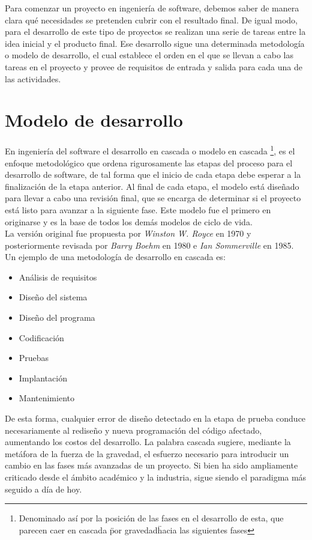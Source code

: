 Para comenzar un proyecto en ingenier\'ia de software, debemos saber de manera clara qu\'e necesidades se pretenden cubrir con el resultado final. De igual modo, para el desarrollo de este tipo de proyectos se realizan una serie de tareas entre la idea inicial y el producto final. Ese desarrollo sigue una determinada metodolog\'ia o modelo de desarrollo, el cual establece el orden en el que se llevan a cabo las tareas en el proyecto y provee de requisitos de entrada y salida para cada una de las actividades.\\

\section{Modelo de desarrollo}
En ingenier\'ia del software el desarrollo en cascada o modelo en cascada  \footnote[1] {Denominado as\'i por la posici\'on de las fases en el desarrollo de esta, que parecen caer en cascada \"por gravedad\" hacia las siguientes fases}, es el enfoque metodol\'ogico que ordena rigurosamente las etapas del proceso para el desarrollo de software, de tal forma que el inicio de cada etapa debe esperar a la finalizaci\'on de la etapa anterior. Al final de cada etapa, el modelo est\'a dise\~nado para llevar a cabo una revisi\'on final, que se encarga de determinar si el proyecto est\'a listo para avanzar a la siguiente fase. Este modelo fue el primero en originarse y es la base de todos los dem\'as modelos de ciclo de vida.\\

La versi\'on original fue propuesta por \textit{Winston W. Royce} en 1970 y posteriormente revisada por \textit{Barry Boehm} en 1980 e \textit{Ian Sommerville} en 1985. Un ejemplo de una metodolog\'ia de desarrollo en cascada es:

\begin{itemize}
	
\item An\'alisis de requisitos
\item Dise\~no del sistema
\item Dise\~no del programa
\item Codificaci\'on
\item Pruebas
\item Implantaci\'on
\item Mantenimiento

\end{itemize}

De esta forma, cualquier error de dise\~no detectado en la etapa de prueba conduce necesariamente al redise\~no y nueva programaci\'on del c\'odigo afectado, aumentando los costos del desarrollo. La palabra cascada sugiere, mediante la met\'afora de la fuerza de la gravedad, el esfuerzo necesario para introducir un cambio en las fases m\'as avanzadas de un proyecto. Si bien ha sido ampliamente criticado desde el \'ambito acad\'emico y la industria, sigue siendo el paradigma m\'as seguido a d\'ia de hoy.\\

